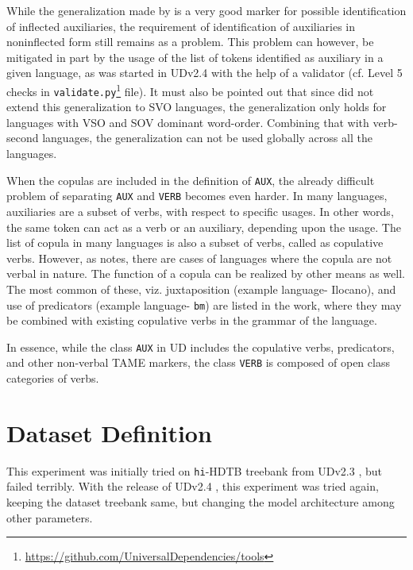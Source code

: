 While the generalization made by \citeauthor{greenberg1963some} is a very good marker for possible identification of inflected auxiliaries, the requirement of identification of auxiliaries in noninflected form still remains as a problem. This problem can however, be mitigated in part by the usage of the list of tokens identified as auxiliary in a given language, as was started in UDv2.4 \citep{UDv2.4} with the help of a validator (cf. Level 5 checks in \verb|validate.py|\footnote{\url{https://github.com/UniversalDependencies/tools}} file). It must also be pointed out that since \citeauthor{greenberg1963some} did not extend this generalization to SVO languages, the generalization only holds for languages with VSO and SOV dominant word-order. Combining that with verb-second languages, the generalization can not be used globally across all the languages.

When the copulas are included in the definition of \verb|AUX|, the already difficult problem of separating \verb|AUX| and \verb|VERB| becomes even harder. In many languages, auxiliaries are a subset of verbs, with respect to specific usages. In other words, the same token can act as a verb or an auxiliary, depending upon the usage. The list of copula in many languages is also a subset of verbs, called as copulative verbs. However, as \citeauthor{langtypology} notes, there are cases of languages where the copula are not verbal in nature. The function of a copula can be realized by other means as well. The most common of these, viz. juxtaposition (example language- Ilocano), and use of predicators (example language- \verb|bm|) are listed in the work, where they may be combined with existing copulative verbs in the grammar of the language.

In essence, while the class \verb|AUX| in UD includes the copulative verbs, predicators, and other non-verbal TAME markers, the class \verb|VERB| is composed of open class categories of verbs.

\section{Dataset Definition}
\label{ssec:auxverbDataset}

This experiment was initially tried on \verb|hi|-HDTB treebank from UDv2.3 \citep{UDv2.3}, but failed terribly. With the release of UDv2.4 \citep{UDv2.4}, this experiment was tried again, keeping the dataset treebank same, but changing the model architecture among other parameters.

